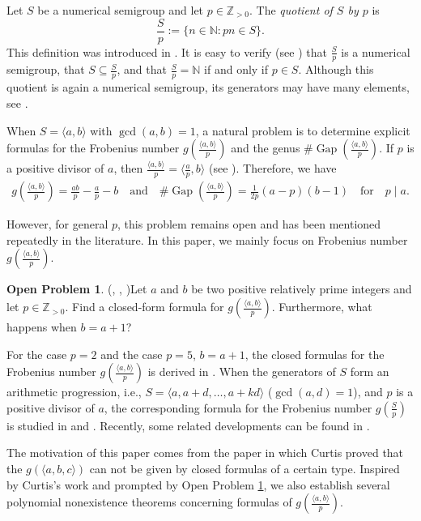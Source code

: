 \documentclass[reqno, 12pt]{article}
\numberwithin{equation}{section}
\theoremstyle{definition}
\newtheorem{prob}[theorem]{Open Problem}
\newcommand{\NN}{\mathbb{N}}
\newcommand{\ZZ}{\mathbb{Z}}
\newcommand{\Gap}{\operatorname{Gap}}
\begin{document}
Let $S$ be a numerical semigroup and let $p\in\ZZ_{>0}$.  The \emph{quotient of $S$ by $p$} is
\[\frac{S}{p}:=\{n\in\NN:pn\in S\}.\]
This definition was introduced in \cite{Rosales03}.
It is easy to verify (see \cite[Section 5]{J.C.Rosales}) that $\frac{S}{p}$ is a numerical semigroup, that $S \subseteq\frac{S}{p}$, and that $\frac{S}{p}=\mathbb{N}$ if and only if $p\in S$. 
Although this quotient is again a numerical semigroup, its generators may have many elements, see \cite{Rosales05,Rosales2006,E.Cabanillas,Alessio19,Liu-BAMS}.

When $S=\langle a,b\rangle$ with $\gcd(a,b)=1$, a natural problem is to determine explicit formulas for the Frobenius number $g\left(\frac{\langle a,b\rangle}{p}\right)$ and the genus $\# \Gap\left(\frac{\langle a,b\rangle}{p}\right)$.
If $p$ is a positive divisor of $a$, then $\frac{\langle a,b\rangle}{p}=\langle \frac{a}{p},b\rangle$ (see \cite{Rosales05}). Therefore, we have
\begin{align*}
g\left(\frac{\langle a,b\rangle}{p}\right)=\frac{ab}{p}-\frac{a}{p}-b\quad \text{and}\quad \# \Gap\left(\frac{\langle a,b\rangle}{p}\right)=\frac{1}{2p}(a-p)(b-1)\quad \text{for}\quad p\mid a.
\end{align*}

However, for general $p$, this problem remains open and has been mentioned repeatedly in the literature. 
In this paper, we mainly focus on Frobenius number $g\left(\frac{\langle a,b\rangle}{p}\right)$.
\begin{prob}{(\cite[Open Problem 6.20]{J.C.Rosales}, \cite[Section 3]{MDelgado13}, \cite[Section 5.4]{E.Cabanillas})}\label{Openproblem}
Let $a$ and $b$ be two positive relatively prime integers and let $p\in\ZZ_{>0}$.
Find a closed-form formula for $g\left(\frac{\langle a,b\rangle}{p}\right)$.
Furthermore, what happens when $b=a+1$?
\end{prob}

For the case $p=2$ and the case $p=5$, $b=a+1$, the closed formulas for the Frobenius number $g\left(\frac{\langle a,b\rangle}{p}\right)$ is derived in \cite{F.Strazzanti}.
When the generators of $S$ form an arithmetic progression, i.e., $S=\langle a,a+d,\ldots,a+kd\rangle$ ($\gcd(a,d)=1$), and $p$ is a positive divisor of $a$, the corresponding formula for the Frobenius number $g\left(\frac{S}{p}\right)$ is studied in \cite{A.Adeniran} and \cite{Liu-IJAC}. Recently, some related developments can be found in \cite{Liu-GCNSNS}.


The motivation of this paper comes from the paper \cite{F.Curtis} in which Curtis proved that the $g(\langle a,b,c\rangle)$ can not be given by closed formulas of a certain type.
Inspired by Curtis's work and prompted by Open Problem \ref{Openproblem}, we also establish several polynomial nonexistence theorems concerning formulas of $g\left(\frac{\langle a,b\rangle}{p}\right)$.
\end{document}
